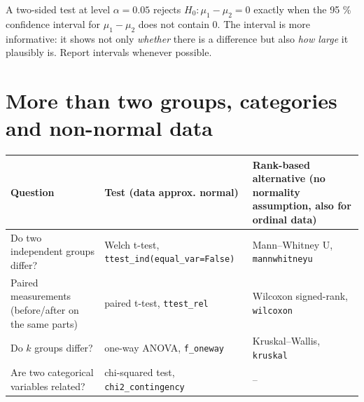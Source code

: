 \documentclass[
  letterpaper,
  DIV=11,
  numbers=noendperiod]{scrreprt}
\begin{document}
\begin{tcolorbox}[enhanced jigsaw, left=2mm, title=\textcolor{quarto-callout-important-color}{\faExclamation}\hspace{0.5em}{Tests and confidence intervals are two sides of one coin}, opacityback=0, breakable, rightrule=.15mm, arc=.35mm, toptitle=1mm, colbacktitle=quarto-callout-important-color!10!white, opacitybacktitle=0.6, coltitle=black, colframe=quarto-callout-important-color-frame, bottomrule=.15mm, leftrule=.75mm, bottomtitle=1mm, titlerule=0mm, toprule=.15mm, colback=white]

A two-sided test at level \(\alpha = 0.05\) rejects
\(H_0: \mu_1 - \mu_2 = 0\) exactly when the 95 \% confidence interval
for \(\mu_1 - \mu_2\) does not contain 0. The interval is more
informative: it shows not only \emph{whether} there is a difference but
also \emph{how large} it plausibly is. Report intervals whenever
possible.

\end{tcolorbox}

\section{More than two groups, categories and non-normal
data}\label{more-than-two-groups-categories-and-non-normal-data}

\begin{longtable}[]{@{}
  >{\raggedright\arraybackslash}p{}
  >{\raggedright\arraybackslash}p{}
  >{\raggedright\arraybackslash}p{}@{}}
\toprule\noalign{}
\begin{minipage}[b]{\linewidth}\raggedright
Question
\end{minipage} & \begin{minipage}[b]{\linewidth}\raggedright
Test (data approx. normal)
\end{minipage} & \begin{minipage}[b]{\linewidth}\raggedright
Rank-based alternative (no normality assumption, also for ordinal data)
\end{minipage} \\
\midrule\noalign{}
\endhead
\bottomrule\noalign{}
\endlastfoot
Do two independent groups differ? & Welch t-test,
\texttt{ttest\_ind(equal\_var=False)} & Mann--Whitney U,
\texttt{mannwhitneyu} \\
Paired measurements (before/after on the same parts) & paired t-test,
\texttt{ttest\_rel} & Wilcoxon signed-rank, \texttt{wilcoxon} \\
Do \(k\) groups differ? & one-way ANOVA, \texttt{f\_oneway} &
Kruskal--Wallis, \texttt{kruskal} \\
Are two categorical variables related? & chi-squared test,
\texttt{chi2\_contingency} & -- \\
\end{longtable}
\end{document}
